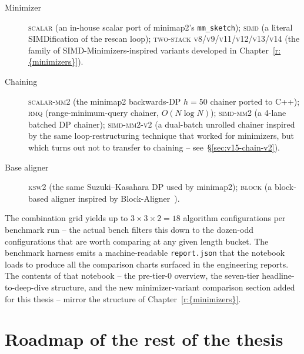 \begin{description}
\item[Minimizer] \textsc{scalar} (an in-house scalar
  port of minimap2's \texttt{mm\_sketch}); \textsc{simd} (a literal
  SIMDification of the rescan loop); \textsc{two-stack v8/v9/v11/v12/v13/v14}
  (the family of SIMD-Minimizers-inspired variants developed in
  Chapter~\ref{r:{minimizers}}).
\item[Chaining] \textsc{scalar-mm2} (the minimap2 backwards-DP
  $h{=}50$ chainer ported to C++); \textsc{rmq} (range-minimum-query
  chainer, $O(N \log N)$); \textsc{simd-mm2} (a 4-lane batched DP
  chainer); \textsc{simd-mm2-v2} (a dual-batch unrolled chainer
  inspired by the same loop-restructuring technique that worked for
  minimizers, but which turns out not to transfer to chaining --
  see~\S\ref{sec:v15-chain-v2}).
\item[Base aligner] \textsc{ksw2} (the same Suzuki--Kasahara DP
  used by minimap2); \textsc{block} (a block-based aligner inspired
  by Block-Aligner~\cite{block_aligner_paper}).
\end{description}

The combination grid yields up to $3 \times 3 \times 2 = 18$
algorithm configurations per benchmark run -- the actual bench
filters this down to the dozen-odd configurations that are worth
comparing at any given length bucket. The benchmark harness emits a
machine-readable \texttt{report.json} that the
 notebook
loads to produce all the comparison charts surfaced in the
engineering reports. The contents of that notebook -- the pre-tier-0
overview, the seven-tier headline-to-deep-dive structure, and the
new minimizer-variant comparison section added for this thesis --
mirror the structure of Chapter~\ref{r:{minimizers}}.

\section{Roadmap of the rest of the thesis}


